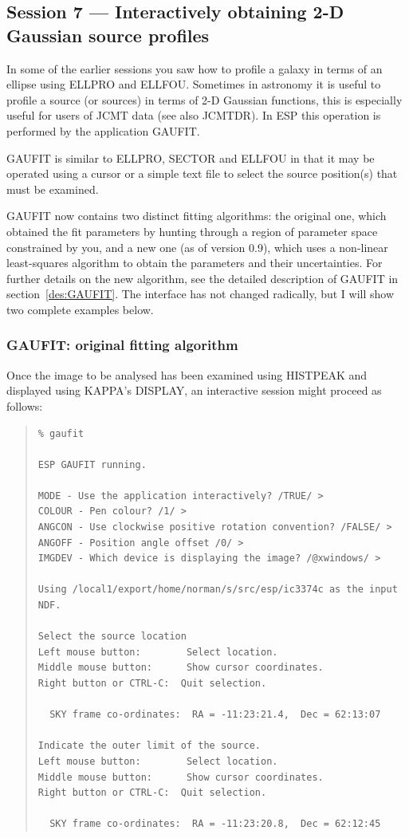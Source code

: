 \documentclass[twoside,11pt]{article}
\newcommand{\xref}[3]{#1}
\newcommand{\xlabel}[1]{}
\newenvironment{myquote}{\begin{quote}\begin{small}}{\end{small}\end{quote}}
\begin{document}
\subsection{Session 7 --- Interactively obtaining 2-D Gaussian source profiles}
\xlabel{SESSION7}
In some of the earlier sessions you saw how to profile a galaxy in
terms of an ellipse using ELLPRO and ELLFOU. Sometimes in astronomy
it is useful to profile a source (or sources) in terms of 2-D Gaussian
functions, this is especially useful for users of JCMT data (see also
\xref{JCMTDR}{sun132}{}). In ESP this operation is performed by the
application GAUFIT.

GAUFIT is similar to ELLPRO, SECTOR and ELLFOU in that it may be operated
using a cursor or a simple text file to select the source position(s) that
must be examined.

GAUFIT now contains two distinct fitting algorithms: the original one,
which obtained the fit parameters by hunting through a region of
parameter space constrained by you, and a new one (as of version 0.9),
which uses a non-linear least-squares algorithm to obtain the
parameters and their uncertainties.  For further details on the new
algorithm, see the detailed description of GAUFIT in
section~\ref{des:GAUFIT}.  The interface has not changed radically,
but I will show two complete examples below.







\subsubsection{GAUFIT: original fitting algorithm}

Once the image to be analysed has been examined using
HISTPEAK and displayed using \xref{KAPPA}{sun95}{}'s DISPLAY, an interactive
session might proceed as follows:

\begin{myquote}
\begin{verbatim}
% gaufit

ESP GAUFIT running.

MODE - Use the application interactively? /TRUE/ >
COLOUR - Pen colour? /1/ >
ANGCON - Use clockwise positive rotation convention? /FALSE/ >
ANGOFF - Position angle offset /0/ >
IMGDEV - Which device is displaying the image? /@xwindows/ >

Using /local1/export/home/norman/s/src/esp/ic3374c as the input NDF.

Select the source location
Left mouse button:        Select location.
Middle mouse button:      Show cursor coordinates.
Right button or CTRL-C:  Quit selection.

  SKY frame co-ordinates:  RA = -11:23:21.4,  Dec = 62:13:07

Indicate the outer limit of the source.
Left mouse button:        Select location.
Middle mouse button:      Show cursor coordinates.
Right button or CTRL-C:  Quit selection.

  SKY frame co-ordinates:  RA = -11:23:20.8,  Dec = 62:12:45
\end{verbatim}
\end{myquote}
\end{document}
